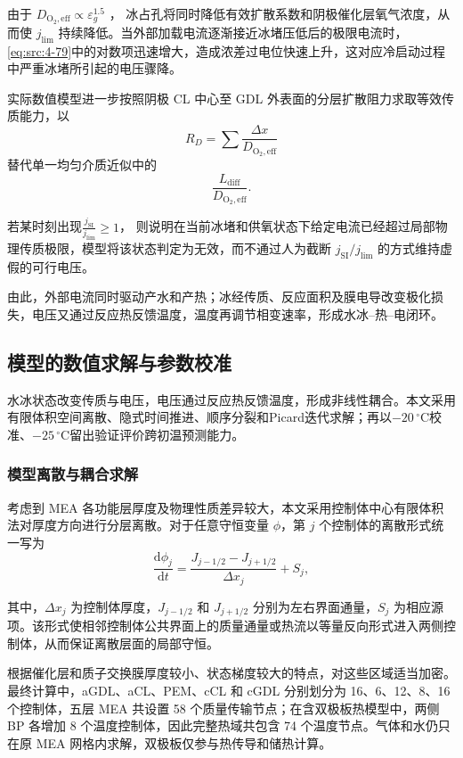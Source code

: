 \documentclass[bwprint]{gmcmthesis}
\numberwithin{equation}{section}
\numberwithin{figure}{section}
\begin{document}
\begin{itemize}
 由于 $D_{\text{O}_2,\text{eff}} \propto \varepsilon_g^{1.5}$ ，
冰占孔将同时降低有效扩散系数和阴极催化层氧气浓度，从而使 \(j_{\text{lim}}\) 持续降低。当外部加载电流逐渐接近冰堵压低后的极限电流时，
\eqref{eq:src:4-79}中的对数项迅速增大，造成浓差过电位快速上升，这对应冷启动过程中严重冰堵所引起的电压骤降。

 实际数值模型进一步按照阴极 CL 中心至 GDL 外表面的分层扩散阻力求取等效传质能力，以
\[
R_D = \sum \frac{\Delta x}{D_{\text{O}_2,\text{eff}}}
\]
替代单一均匀介质近似中的
\[
\frac{L_{\text{diff}}}{D_{\text{O}_2,\text{eff}}}.
\]

 若某时刻出现$\frac{j_{\mathrm{SI}}}{j_{\text{lim}}} \geq 1$，
则说明在当前冰堵和供氧状态下给定电流已经超过局部物理传质极限，模型将该状态判定为无效，而不通过人为截断 \(j_{\mathrm{SI}} / j_{\text{lim}}\) 的方式维持虚假的可行电压。

由此，外部电流同时驱动产水和产热；冰经传质、反应面积及膜电导改变极化损失，电压又通过反应热反馈温度，温度再调节相变速率，形成水冰--热--电闭环。

\end{itemize}


\subsection{模型的数值求解与参数校准}
水冰状态改变传质与电压，电压通过反应热反馈温度，形成非线性耦合。本文采用有限体积空间离散、隐式时间推进、顺序分裂和Picard迭代求解；再以$-20\,^\circ\mathrm C$校准、$-25\,^\circ\mathrm C$留出验证评价跨初温预测能力。

\subsubsection{模型离散与耦合求解}

 考虑到 MEA 各功能层厚度及物理性质差异较大，本文采用控制体中心有限体积法对厚度方向进行分层离散。对于任意守恒变量 \(\phi\)，第 \(j\) 个控制体的离散形式统一写为
\begin{equation}
\frac{\mathrm{d}\phi_j}{\mathrm{d}t} = \frac{J_{j-1/2} - J_{j+1/2}}{\Delta x_j} + S_j, \label{eq:src:4-81}
\end{equation}

 其中，\(\Delta x_j\) 为控制体厚度，\(J_{j-1/2}\) 和 \(J_{j+1/2}\) 分别为左右界面通量，\(S_j\) 为相应源项。该形式使相邻控制体公共界面上的质量通量或热流以等量反向形式进入两侧控制体，从而保证离散层面的局部守恒。

 根据催化层和质子交换膜厚度较小、状态梯度较大的特点，对这些区域适当加密。最终计算中，aGDL、aCL、PEM、cCL 和 cGDL 分别划分为 16、6、12、8、16 个控制体，五层 MEA 共设置 58 个质量传输节点；在含双极板热模型中，两侧 BP 各增加 8 个温度控制体，因此完整热域共包含 74 个温度节点。气体和水仍只在原 MEA 网格内求解，双极板仅参与热传导和储热计算。
\end{document}
